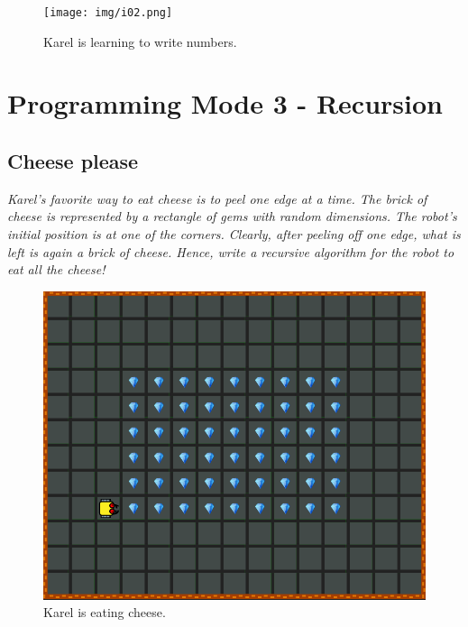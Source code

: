 \begin{figure}[!ht]
\begin{center}
\texttt{[image: img/i02.png]}
\end{center}
\vspace{-4mm}
\caption{Karel is learning to write numbers.}
\label{fig:g11}
\vspace{-12mm}
\end{figure}

\newpage



\section{Programming Mode 3 - Recursion}

\subsection{Cheese please}

{\em Karel's favorite way to eat cheese is to peel one edge at a time. The brick of cheese is represented by a rectangle of gems with random dimensions. The robot's initial position is at one of the corners. Clearly, after peeling off one edge, what is left is again a brick of cheese. Hence, write a recursive algorithm for the robot to eat all the cheese!}%

\begin{figure}[!ht]
\begin{center}
\includegraphics[height=0.4\textwidth]{img/g01.png}
\end{center}
\vspace{-4mm}
\caption{Karel is eating cheese.}
\label{fig:g01}
\end{figure}

\newpage


